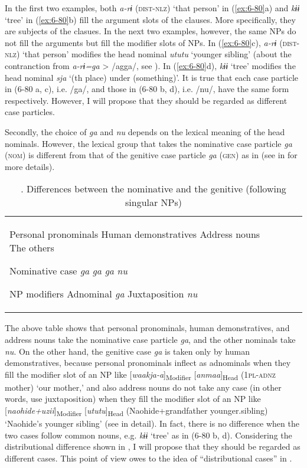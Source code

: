 In the first two examples, both \textit{a-rɨ} (\textsc{dist}-\textsc{nlz}) ‘that person’ in (\ref{ex:6-80}a) and \textit{kɨɨ} ‘tree’ in (\ref{ex:6-80}b) fill the argument slots of the clauses. More specifically, they are subjects of the clasues. In the next two examples, however, the same NPs do not fill the arguments but fill the modifier slots of NPs. In (\ref{ex:6-80}c), \textit{a-rɨ} (\textsc{dist}-\textsc{nlz}) ‘that person’ modifies the head nominal \textit{ututu} ‘younger sibling’ (about the contranction from \textit{a-rɨ=ga} > /agga/, see ). In (\ref{ex:6-80}d), \textit{kɨɨ} ‘tree’ modifies the head nominal \textit{sja} ‘(th place) under (something)’. It is true that each case particle in (6-80 a, c), i.e. /ga/, and those in (6-80 b, d), i.e. /nu/, have the same form respectively. However, I will propose that they should be regarded as different case particles.

Secondly, the choice of \textit{ga} and \textit{nu} depends on the lexical meaning of the head nominals. However, the lexical group that takes the nominative case particle \textit{ga} (\textsc{nom}) is different from that of the genitive case particle \textit{ga} (\textsc{gen}) as in  (see  in  for more details).


\begin{table}


\caption{\label{tab:key:41}. Differences between the nominative and the genitive (following singular NPs)}
\begin{tabular}{llll}

  Personal pronominals  Human demonstratives  Address nouns  The others

Nominative case  \textit{ga}  \textit{ga}  \textit{ga}  \textit{nu}

NP modifiers  Adnominal  \textit{ga}  Juxtaposition  \textit{nu}
\end{tabular}
\end{table}

The above table shows that personal pronominals, human demonstratives, and address nouns take the nominative case particle \textit{ga}, and the other nominals take \textit{nu}. On the other hand, the genitive case \textit{ga} is taken only by human demonstratives, because personal pronominals inflect as adnominals when they fill the modifier slot of an NP like [\textit{waakja-a}]\textsubscript{Modifier} [\textit{anmaa}]\textsubscript{Head} (1\textsc{pl}-\textsc{adnz} mother) ‘our mother,’ and also address nouns do not take any case (in other words, use juxtaposition) when they fill the modifier slot of an NP like [\textit{naohide+uzii}]\textsubscript{Modifier} [\textit{ututu}]\textsubscript{Head} (Naohide+grandfather younger.sibling) ‘Naohide’s younger sibling’ (see  in detail). In fact, there is no difference when the two cases follow common nouns, e.g. \textit{kɨɨ} ‘tree’ as in (6-80 b, d). Considering the distributional difference shown in , I will propose that they should be regarded as different cases. This point of view owes to the idea of “distributional cases” in \citet{Comrie1991}.

